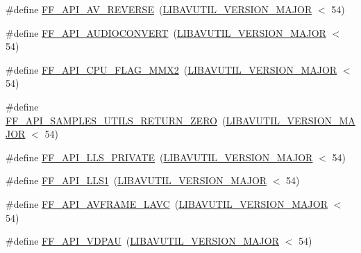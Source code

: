 \begin{DoxyCompactItemize}
\#define \hyperlink{group__depr__guards_gab0b09a8ae1d3d054eddb618e6547e1ba}{F\+F\+\_\+\+A\+P\+I\+\_\+\+A\+V\+\_\+\+R\+E\+V\+E\+R\+SE}~(\hyperlink{group__lavu__ver_gaa29a3ad3376b8050d9ef4779045f745e}{L\+I\+B\+A\+V\+U\+T\+I\+L\+\_\+\+V\+E\+R\+S\+I\+O\+N\+\_\+\+M\+A\+J\+OR} $<$ 54)
\item 
\#define \hyperlink{group__depr__guards_ga3a0080aa1ffefa42210b4cd9f14230df}{F\+F\+\_\+\+A\+P\+I\+\_\+\+A\+U\+D\+I\+O\+C\+O\+N\+V\+E\+RT}~(\hyperlink{group__lavu__ver_gaa29a3ad3376b8050d9ef4779045f745e}{L\+I\+B\+A\+V\+U\+T\+I\+L\+\_\+\+V\+E\+R\+S\+I\+O\+N\+\_\+\+M\+A\+J\+OR} $<$ 54)
\item 
\#define \hyperlink{group__depr__guards_gab98eef4e4bff6677fdfc6b77d1049a6c}{F\+F\+\_\+\+A\+P\+I\+\_\+\+C\+P\+U\+\_\+\+F\+L\+A\+G\+\_\+\+M\+M\+X2}~(\hyperlink{group__lavu__ver_gaa29a3ad3376b8050d9ef4779045f745e}{L\+I\+B\+A\+V\+U\+T\+I\+L\+\_\+\+V\+E\+R\+S\+I\+O\+N\+\_\+\+M\+A\+J\+OR} $<$ 54)
\item 
\#define \hyperlink{group__depr__guards_ga46ef2b17087b07aeae272bcd0b04e8cd}{F\+F\+\_\+\+A\+P\+I\+\_\+\+S\+A\+M\+P\+L\+E\+S\+\_\+\+U\+T\+I\+L\+S\+\_\+\+R\+E\+T\+U\+R\+N\+\_\+\+Z\+E\+RO}~(\hyperlink{group__lavu__ver_gaa29a3ad3376b8050d9ef4779045f745e}{L\+I\+B\+A\+V\+U\+T\+I\+L\+\_\+\+V\+E\+R\+S\+I\+O\+N\+\_\+\+M\+A\+J\+OR} $<$ 54)
\item 
\#define \hyperlink{group__depr__guards_gaf7de99d975f9df71b4534d9e272a70e5}{F\+F\+\_\+\+A\+P\+I\+\_\+\+L\+L\+S\+\_\+\+P\+R\+I\+V\+A\+TE}~(\hyperlink{group__lavu__ver_gaa29a3ad3376b8050d9ef4779045f745e}{L\+I\+B\+A\+V\+U\+T\+I\+L\+\_\+\+V\+E\+R\+S\+I\+O\+N\+\_\+\+M\+A\+J\+OR} $<$ 54)
\item 
\#define \hyperlink{group__depr__guards_ga18964bd941896be807b8308d1b26f93d}{F\+F\+\_\+\+A\+P\+I\+\_\+\+L\+L\+S1}~(\hyperlink{group__lavu__ver_gaa29a3ad3376b8050d9ef4779045f745e}{L\+I\+B\+A\+V\+U\+T\+I\+L\+\_\+\+V\+E\+R\+S\+I\+O\+N\+\_\+\+M\+A\+J\+OR} $<$ 54)
\item 
\#define \hyperlink{group__depr__guards_ga67e9304f7c19df7a55773155fbbb91b3}{F\+F\+\_\+\+A\+P\+I\+\_\+\+A\+V\+F\+R\+A\+M\+E\+\_\+\+L\+A\+VC}~(\hyperlink{group__lavu__ver_gaa29a3ad3376b8050d9ef4779045f745e}{L\+I\+B\+A\+V\+U\+T\+I\+L\+\_\+\+V\+E\+R\+S\+I\+O\+N\+\_\+\+M\+A\+J\+OR} $<$ 54)
\item 
\#define \hyperlink{group__depr__guards_ga62076941b7203055c7284c9b846f2a5d}{F\+F\+\_\+\+A\+P\+I\+\_\+\+V\+D\+P\+AU}~(\hyperlink{group__lavu__ver_gaa29a3ad3376b8050d9ef4779045f745e}{L\+I\+B\+A\+V\+U\+T\+I\+L\+\_\+\+V\+E\+R\+S\+I\+O\+N\+\_\+\+M\+A\+J\+OR} $<$ 54)

\end{DoxyCompactItemize}
